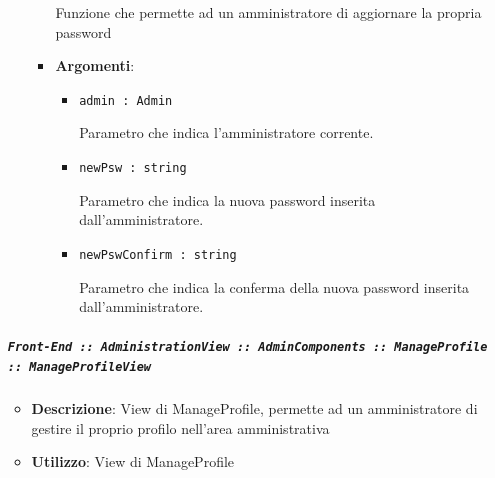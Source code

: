 \documentclass[../DefinizioneDiProdotto.tex]{subfiles}
\begin{document}
\begin{itemize}
\begin{itemize}
\begin{itemize}
	 Funzione che permette ad un amministratore di aggiornare la propria password

	\item \textbf{Argomenti}:
	\begin{itemize}
	\item \texttt{admin : Admin}\

	 Parametro che indica l'amministratore corrente.
	\item \texttt{newPsw : string}\

	 Parametro che indica la nuova password inserita dall'amministratore.
	\item \texttt{newPswConfirm : string}\

	 Parametro che indica la conferma della nuova password inserita dall'amministratore.
	\end{itemize}
	\end{itemize}\vspace{0.5em}
	\end{itemize}\subparagraph{\texttt{Front-End :: AdministrationView :: AdminComponents :: ManageProfile :: ManageProfileView}}
	\begin{itemize}\item \textbf{Descrizione}: View di ManageProfile, permette ad un amministratore di gestire il proprio profilo nell'area amministrativa
	\item \textbf{Utilizzo}: View di ManageProfile
	\end{itemize}\end{itemize}

	\newpage
\end{document}
